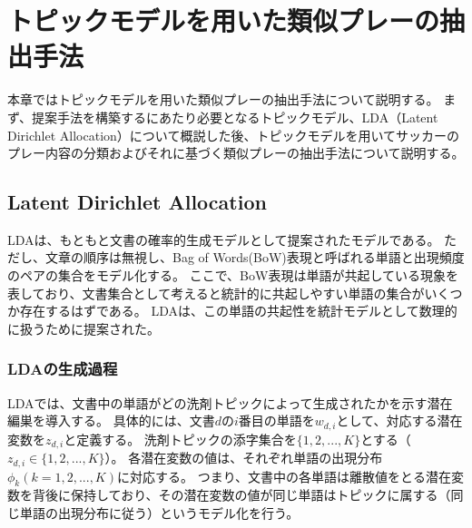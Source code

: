 \section{トピックモデルを用いた類似プレーの抽出手法}
\label{sec:lda}
本章ではトピックモデルを用いた類似プレーの抽出手法について説明する。
まず、提案手法を構築するにあたり必要となるトピックモデル、LDA（Latent Dirichlet Allocation）について概説した後、トピックモデルを用いてサッカーのプレー内容の分類およびそれに基づく類似プレーの抽出手法について説明する。



\subsection{Latent Dirichlet Allocation}
LDAは、もともと文書の確率的生成モデルとして提案されたモデルである。
ただし、文章の順序は無視し、Bag of Words(BoW)表現と呼ばれる単語と出現頻度のペアの集合をモデル化する。
ここで、BoW表現は単語が共起している現象を表しており、文書集合として考えると統計的に共起しやすい単語の集合がいくつか存在するはずである。
LDAは、この単語の共起性を統計モデルとして数理的に扱うために提案された。


\subsubsection{LDAの生成過程}
LDAでは、文書中の単語がどの洗剤トピックによって生成されたかを示す潜在編巣を導入する。
具体的には、文書$d$の$i$番目の単語を$w_{d,i}$として、対応する潜在変数を$z_{d,i}$と定義する。
洗剤トピックの添字集合を$\{1,2,...,K\}$とする（$z_{d,i}\in\{1,2,...,K\}$）。
各潜在変数の値は、それぞれ単語の出現分布$\phi_k(k=1,2,...,K)$に対応する。
つまり、文書中の各単語は離散値をとる潜在変数を背後に保持しており、その潜在変数の値が同じ単語はトピックに属する（同じ単語の出現分布に従う）というモデル化を行う。

